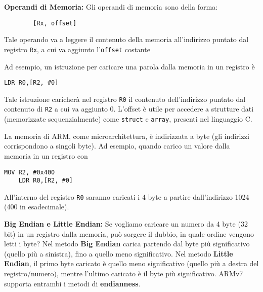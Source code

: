 \begin{defn}
	\textbf{Operandi di Memoria:}
	Gli operandi di memoria sono della forma:
	\begin{lstlisting}
		[Rx, offset]
	\end{lstlisting}
	
	Tale operando va a leggere il contenuto della memoria all'indirizzo puntato dal registro \verb|Rx|, a cui va aggiunto l'\verb|offset| costante
	
	Ad esempio, un istruzione per caricare una parola dalla memoria in un registro è 
	\begin{lstlisting}[style=arm]
	LDR R0,[R2, #0]
	\end{lstlisting}
	
	Tale istruzione caricherà nel registro \verb|R0| il contenuto dell'indirizzo puntato dal contenuto di \verb|R2| a cui va aggiunto 0. L'offset è utile per accedere a strutture dati (memorizzate sequenzialmente) come \verb|struct| e \verb|array|, presenti nel linguaggio C.
\end{defn}

\begin{note}
	La memoria di ARM, come microarchitettura, è indirizzata a byte (gli indirizzi corrispondono a singoli byte). Ad esempio, quando carico un valore dalla memoria in un registro con
	\begin{lstlisting}[style=arm]
	MOV R2, #0x400
	LDR R0,[R2, #0]
	\end{lstlisting}
	
	All'interno del registro \verb|R0| saranno caricati i 4 byte a partire dall'indirizzo 1024 (400 in esadecimale).
\end{note}

\begin{defn}
	\textbf{Big Endian e Little Endian:} Se vogliamo caricare un numero da 4 byte (32 bit) in un registro dalla memoria, può sorgere il dubbio, in quale ordine vengono letti i byte? Nel metodo \textbf{Big Endian} carica partendo dal byte più significativo (quello più a sinistra), fino a quello meno significativo. Nel metodo \textbf{Little Endian}, il primo byte caricato è quello meno significativo (quello più a destra del registro/numero), mentre l'ultimo caricato è il byte più significativo. ARMv7 supporta entrambi i metodi di \textbf{endianness}.
\end{defn}

